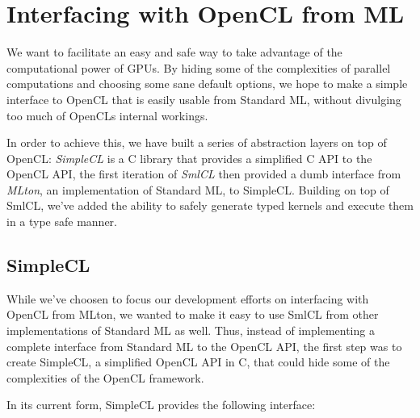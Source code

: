 \section{Interfacing with OpenCL from ML}

We want to facilitate an easy and safe way to take advantage of the
computational power of GPUs. By hiding some of the complexities of
parallel computations and choosing some sane default options, we hope
to make a simple interface to OpenCL that is easily usable from
Standard ML, without divulging too much of OpenCLs internal workings.

In order to achieve this, we have built a series of abstraction layers
on top of OpenCL: \emph{SimpleCL} is a C library that provides a
simplified C API to the OpenCL API, the first iteration of \emph{SmlCL} then
provided a dumb interface from \emph{MLton}, an implementation of Standard
ML, to SimpleCL. Building on top of SmlCL, we've added the ability to
safely generate typed kernels and execute them in a type safe manner.

\subsection{SimpleCL}

While we've choosen to focus our development efforts on interfacing
with OpenCL from MLton, we wanted to make it easy to use SmlCL from
other implementations of Standard ML as well. Thus, instead of
implementing a complete interface from Standard ML to the OpenCL API,
the first step was to create SimpleCL, a simplified OpenCL API in C,
that could hide some of the complexities of the OpenCL framework.

In its current form, SimpleCL provides the following interface:

